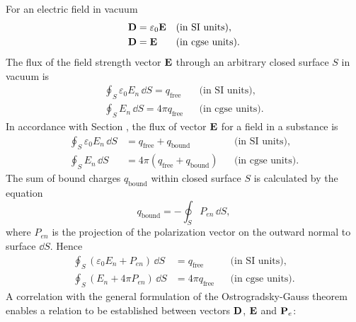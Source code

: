 \subsection{}\label{18.3.4} For an electric field in vacuum
\begin{align*}%
\vb{D} & = \varepsilon_{0} \vb{E} && \text{(in SI units),} \\
\vb{D} & =  \vb{E}&& \text{(in cgse units).}
\end{align*}
The flux of the field strength vector $\vb{E}$ through an arbitrary closed surface $S$ in vacuum is
\begin{align*}%
\oint_{S} \varepsilon_{0}  E_{n}\, \dd S =  q_{\text{free}} && \text{(in SI units),} \\
\oint_{S}  E_{n}\, \dd S =  4 \pi q_{\text{free}}&& \text{(in cgse units).}
\end{align*}
In accordance with Section , the flux of vector $\vb{E}$ for a field in a substance is
\begin{align*}%
\oint_{S} \varepsilon_{0}  E_{n}\, \dd S & =  q_{\text{free}} + q_{\text{bound}} && \text{(in SI units),} \\
\oint_{S}  E_{n}\, \dd S & =  4 \pi (q_{\text{free}} + q_{\text{bound}})&& \text{(in cgse units).}
\end{align*}
The sum of bound charges $q_{\text{bound}}$ within closed surface $S$ is calculated by the equation
\begin{equation*}%
q_{\text{bound}} = - \oint_{S} P_{en} \, \dd S,
\end{equation*}
where $P_{en}$ is the projection of the polarization vector on the outward normal to surface $\dd S$. Hence
\begin{align*}%
\oint_{S} (\varepsilon_{0}  E_{n} + P_{en})\, \dd S & =  q_{\text{free}}  && \text{(in SI units),} \\
\oint_{S} ( E_{n} + 4 \pi P_{en})\, \dd S & =  4 \pi q_{\text{free}} && \text{(in cgse units).}
\end{align*}
A correlation with the general formulation of the Ostrogradsky-Gauss theorem  enables a relation to be established between vectors $\vb{D}$, $\vb{E}$ and $\vb{P}_{e}$:
